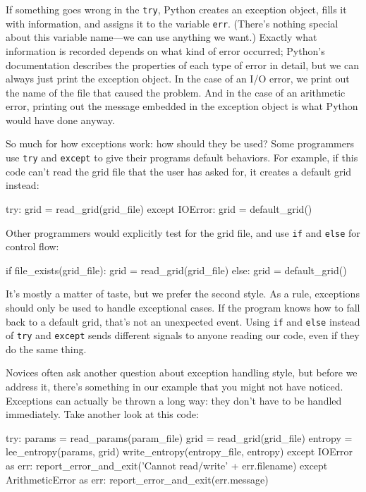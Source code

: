 If something goes wrong in the \texttt{try}, Python creates an exception
object, fills it with information, and assigns it to the variable
\texttt{err}. (There's nothing special about this variable name---we can
use anything we want.) Exactly what information is recorded depends on
what kind of error occurred; Python's documentation describes the
properties of each type of error in detail, but we can always just print
the exception object. In the case of an I/O error, we print out the name
of the file that caused the problem. And in the case of an arithmetic
error, printing out the message embedded in the exception object is what
Python would have done anyway.

So much for how exceptions work: how should they be used? Some
programmers use \texttt{try} and \texttt{except} to give their programs
default behaviors. For example, if this code can't read the grid file
that the user has asked for, it creates a default grid instead:

\begin{VerbIn}
try:
    grid = read_grid(grid_file)
except IOError:
    grid = default_grid()
\end{VerbIn}

Other programmers would explicitly test for the grid file, and use
\texttt{if} and \texttt{else} for control flow:

\begin{VerbIn}
if file_exists(grid_file):
    grid = read_grid(grid_file)
else:
    grid = default_grid()
\end{VerbIn}

It's mostly a matter of taste, but we prefer the second style. As a
rule, exceptions should only be used to handle exceptional cases. If the
program knows how to fall back to a default grid, that's not an
unexpected event. Using \texttt{if} and \texttt{else} instead of
\texttt{try} and \texttt{except} sends different signals to anyone
reading our code, even if they do the same thing.

Novices often ask another question about exception handling style, but
before we address it, there's something in our example that you might
not have noticed. Exceptions can actually be thrown a long way: they
don't have to be handled immediately. Take another look at this code:

\begin{VerbIn}
try:
    params = read_params(param_file)
    grid = read_grid(grid_file)
    entropy = lee_entropy(params, grid)
    write_entropy(entropy_file, entropy)
except IOError as err:
    report_error_and_exit('Cannot read/write' + err.filename)
except ArithmeticError as err:
    report_error_and_exit(err.message)
\end{VerbIn}

